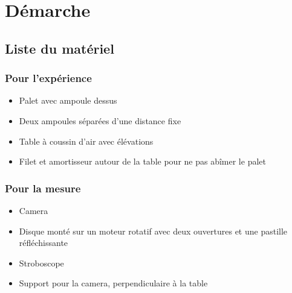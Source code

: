 \documentclass[11pt]{article}
\begin{document}
\section{Démarche}
\subsection{Liste du matériel}
\subsubsection*{Pour l'expérience}
\begin{itemize}
    \item Palet avec ampoule dessus
    \item Deux ampoules séparées d’une distance fixe
    \item Table à coussin d’air avec élévations
    \item Filet et amortisseur autour de la table pour ne pas abîmer le palet
\end{itemize}

    
\subsubsection*{Pour la mesure}
\begin{itemize}
    \item Camera
    \item Disque monté sur un moteur rotatif avec deux ouvertures et une pastille réfléchissante
    \item Stroboscope
    \item Support pour la camera, perpendiculaire à la table
\end{itemize}
    
\end{document}
